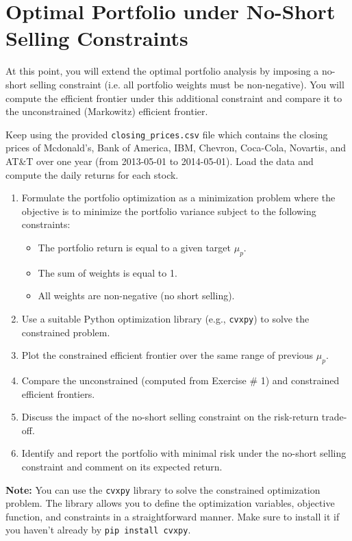 \newpage
\section*{Optimal Portfolio under No-Short Selling Constraints}
At this point, you will extend the optimal portfolio analysis by imposing a no-short selling constraint (i.e. all portfolio weights must be non-negative).
You will compute the efficient frontier under this additional constraint and compare it to the unconstrained (Markowitz) efficient frontier.

\noindent Keep using the provided \texttt{closing\_prices.csv} file which contains the closing prices of Mcdonald's, Bank of America, IBM, Chevron, Coca-Cola, Novartis, and AT\&T over one year (from 2013-05-01 to 2014-05-01). Load the data and compute the daily returns for each stock.

\begin{enumerate}
        \item Formulate the portfolio optimization as a minimization problem where the objective is to minimize the portfolio variance subject to the following constraints:
        \begin{itemize}
            \item The portfolio return is equal to a given target $\mu_p$.
            \item The sum of weights is equal to 1.
            \item All weights are non-negative (no short selling).
        \end{itemize}
        \item Use a suitable Python optimization library (e.g., \texttt{cvxpy}) to solve the constrained problem.
        \item Plot the constrained efficient frontier over the same range of previous $\mu_p$.
        \item Compare the unconstrained (computed from Exercise \# 1) and constrained efficient frontiers.
        \item Discuss the impact of the no-short selling constraint on the risk-return trade-off.
        \item Identify and report the portfolio with minimal risk under the no-short selling constraint and comment on its expected return.
\end{enumerate}
\textbf{Note:} You can use the \texttt{cvxpy} library to solve the constrained optimization problem. The library allows you to define the optimization variables, objective function, and constraints in a straightforward manner. Make sure to install it if you haven't already by \texttt{pip install cvxpy}.
